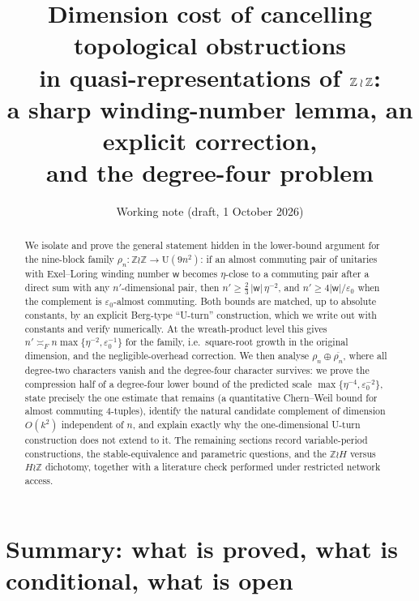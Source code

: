 \documentclass[11pt]{amsart}
\title[Dimension cost of cancelling obstructions]{Dimension cost of cancelling topological obstructions\\ in quasi-representations of $\Z\wr\Z$:\\ a sharp winding-number lemma, an explicit correction,\\ and the degree-four problem}
\author{Working note (draft, 1 October 2026)}
\theoremstyle{definition}
\theoremstyle{remark}
\newcommand{\Z}{\mathbb Z}
\newcommand{\wind}{\mathsf w}
\newcommand{\U}{\mathrm U}
\begin{document}
\begin{abstract}
We isolate and prove the general statement hidden in the lower-bound argument for the nine-block family $\rho_n\colon\Z\wr\Z\to\U(9n^2)$: if an almost commuting pair of unitaries with Exel--Loring winding number $\wind$ becomes $\eta$-close to a commuting pair after a direct sum with any $n'$-dimensional pair, then $n'\ge \tfrac23\,|\wind|\,\eta^{-2}$, and $n'\ge 4|\wind|/\varepsilon_0$ when the complement is $\varepsilon_0$-almost commuting. Both bounds are matched, up to absolute constants, by an explicit Berg-type ``U-turn'' construction, which we write out with constants and verify numerically. At the wreath-product level this gives $n'\asymp_F n\max\{\eta^{-2},\varepsilon_0^{-1}\}$ for the family, i.e.\ square-root growth in the original dimension, and the negligible-overhead correction. We then analyse $\rho_n\oplus\overline{\rho_n}$, where all degree-two characters vanish and the degree-four character survives: we prove the compression half of a degree-four lower bound of the predicted scale $\max\{\eta^{-4},\varepsilon_0^{-2}\}$, state precisely the one estimate that remains (a quantitative Chern--Weil bound for almost commuting $4$-tuples), identify the natural candidate complement of dimension $O(k^2)$ independent of $n$, and explain exactly why the one-dimensional U-turn construction does not extend to it. The remaining sections record variable-period constructions, the stable-equivalence and parametric questions, and the $\Z\wr H$ versus $H\wr\Z$ dichotomy, together with a literature check performed under restricted network access.
\end{abstract}
\maketitle
\tableofcontents

\section*{Summary: what is proved, what is conditional, what is open}
\end{document}
